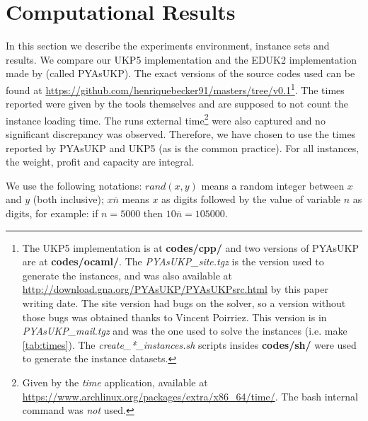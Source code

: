 \documentclass[runningheads,a4paper]{llncs}
\begin{document}
\section{Computational Results}
In this section we describe the experiments environment, instance sets and results. We compare our UKP5 implementation and the EDUK2 implementation made by \cite{pya} (called PYAsUKP). The exact versions of the source codes used can be found at \url{https://github.com/henriquebecker91/masters/tree/v0.1}\footnote{The UKP5 implementation is at \textbf{codes/cpp/} and two versions of PYAsUKP are at \textbf{codes/ocaml/}. The \emph{PYAsUKP\_site.tgz} is the version used to generate the instances, and was also available at \url{http://download.gna.org/PYAsUKP/PYAsUKPsrc.html} by this paper writing date. The site version had bugs on the solver, so a version without those bugs was obtained thanks to Vincent Poirriez. This version is in \emph{PYAsUKP\_mail.tgz} and was the one used to solve the instances (i.e. make \ref{tab:times}). The \emph{create\_*\_instances.sh} scripts insides \textbf{codes/sh/} were used to generate the instance datasets.}. The times reported were given by the tools themselves and are supposed to not count the instance loading time. The runs external time\footnote{Given by the \textit{time} application, available at \url{https://www.archlinux.org/packages/extra/x86_64/time/}. The bash internal command was \emph{not} used.} were also captured and no significant discrepancy was observed. Therefore, we have chosen to use the times reported by PYAsUKP and UKP5 (as is the common practice). For all instances, the weight, profit and capacity are integral.

We use the following notations: \(rand(x, y)\) means a random integer between \(x\) and \(y\) (both inclusive); \(x\overline{n}\) means \(x\) as digits followed by the value of variable \(n\) as digits, for example: if \(n = 5000\) then \(10\overline{n} = 105000\).

\end{document}
